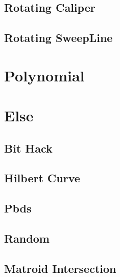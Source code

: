 \subsection{Rotating Caliper}

\subsection{Rotating SweepLine}


\section{Polynomial}


\section{Else}
\subsection{Bit Hack}

\subsection{Hilbert Curve}

\subsection{Pbds}

\subsection{Random}

\subsection{Matroid Intersection}
